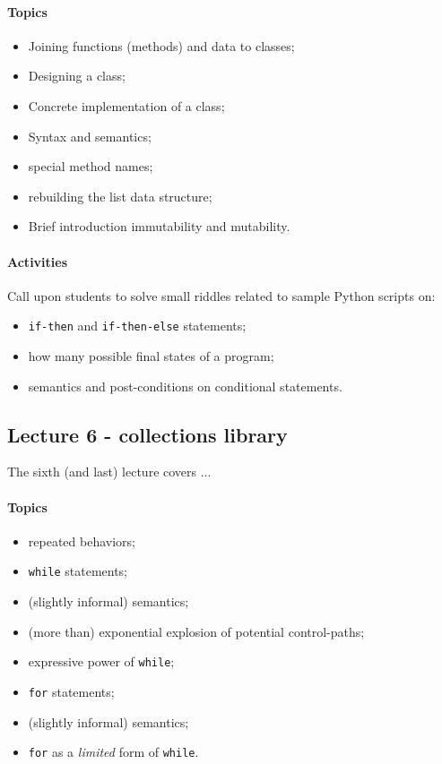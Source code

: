 				\paragraph*{Topics}
					\begin{itemize}
						\item Joining functions (methods) and data to classes;
						\item Designing a class;
						\item Concrete implementation of a class;
						\item Syntax and semantics;
						\item special method names;
						\item rebuilding the list data structure;
						\item Brief introduction immutability and mutability.
					\end{itemize}

				\paragraph*{Activities}
					Call upon students to solve small riddles related to sample Python scripts on:

					\begin{itemize}
						\item \texttt{if-then} and \texttt{if-then-else} statements;
						\item how many possible final states of a program;
						\item semantics and post-conditions on conditional statements.
					\end{itemize}


			\subsection{Lecture 6 - collections library}
				The sixth (and last) lecture covers ...

				\paragraph*{Topics}
					\begin{itemize}
						\item repeated behaviors;
						\item \texttt{while} statements;
						\item (slightly informal) semantics;
						\item (more than) exponential explosion of potential control-paths;
						\item expressive power of \texttt{while};
						\item \texttt{for} statements;
						\item (slightly informal) semantics;
						\item \texttt{for} as a \textit{limited} form of \texttt{while}.
					\end{itemize}

